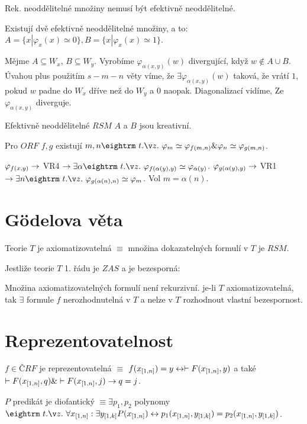 \thm{} Rek. neoddělitelné množiny nemusí být efektivně neoddělitelné.

\thm{} Existují dvě efektivně neoddělitelné množiny, a to:
$A = \{x | \varphi_x(x) \simeq 0 \}, B = \{ x | \varphi_x(x) \simeq 1 \}$.

\prf{} Mějme $A \subseteq W_x$, $B \subseteq W_y$. Vyrobíme $\varphi_{\alpha(x,y)}(w)$ divergující, když $w \not \in A \cup B$.
Úvahou plus použitím $s-m-n$ věty víme, že $\exists \varphi_{\alpha(x,y)}(w)$ taková, že vrátí $1$, pokud $w$ padne do $W_x$ dříve než do $W_y$ a $0$ naopak. Diagonalizací vidíme, Ze $\varphi_{\alpha(x,y)}$ diverguje.

\obs{} Efektivně neoddělitelné $RSM$ $A$ a $B$ jsou kreativní.

 Pro $ORF$ $f,g$ existují $m,n \st \varphi_m \simeq \varphi_{f(m,n)} \& \varphi_n \simeq \varphi_{g(m,n)}$.

\prf{} $\varphi_{f(x,y)} \rightarrow$ VR4 $\then \exists \alpha \st \varphi_{f(\alpha(y),y)} \simeq \varphi_{\alpha(y)}$.
$\varphi_{g(\alpha(y),y)} \rightarrow$ VR1 $\then \exists n \st \varphi_{g(\alpha(n), n)} \simeq \varphi_m$. Vol $m = \alpha(n)$.


\section{Gödelova věta}

\dfn Teorie $T$ je axiomatizovatelná $\equiv$ množina dokazatelných formulí v $T$ je $RSM$. 

 Jestliže teorie $T$ 1. řádu je $ZAS$ a je bezesporná:

\itemize\ibull
\: Množina axiomatizovatelných formulí není rekurzivní.
\: je-li $T$ axiomatizovatelná, tak $\exists$ formule $f$ nerozhodnutelná v $T$ a nelze v $T$ rozhodnout vlastní bezespornost.
\endlist

\section{Reprezentovatelnost}

\dfn $f \in ČRF$ je reprezentovatelná $\equiv$ $f(x_{[1,n]} ) = y \leftrightarrow \vdash F( x_{[1,n]} , y)$ a také
$\vdash F(x_{[1,n]} , q) \& \vdash F(x_{[1,n]} , j) \rightarrow q = j$.

\dfn $P$ predikát je diofantický $\equiv \exists p_1, p_2$ polynomy $\st \forall \mls x n : \exists \mls y k P(\mls x n ) \iff p_1(\mls x n , \mls y k ) = p_2(\mls x n , \mls y k )$.

